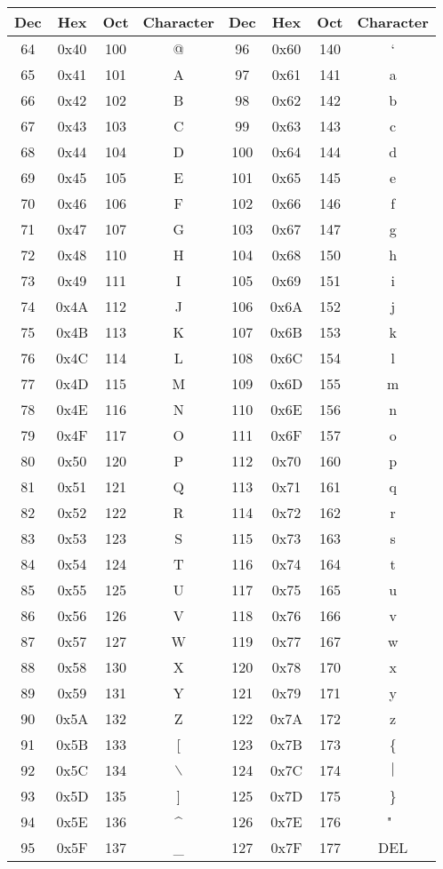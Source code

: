 \begin{longtable}{|c|c|c|c||c|c|c|c|}
\hline
Dec & Hex & Oct & Character & Dec & Hex & Oct & Character\\
\hline
64 & 0x40 & 100 & @ & 96 & 0x60 & 140 & ` \\
65 & 0x41 & 101 & A & 97 & 0x61 & 141 & a \\
66 & 0x42 & 102 & B & 98 & 0x62 & 142 & b \\
67 & 0x43 & 103 & C & 99 & 0x63 & 143 & c \\
68 & 0x44 & 104 & D & 100 & 0x64 & 144 & d \\
69 & 0x45 & 105 & E & 101 & 0x65 & 145 & e \\
70 & 0x46 & 106 & F & 102 & 0x66 & 146 & f \\
71 & 0x47 & 107 & G & 103 & 0x67 & 147 & g \\
72 & 0x48 & 110 & H & 104 & 0x68 & 150 & h \\
73 & 0x49 & 111 & I & 105 & 0x69 & 151 & i \\
74 & 0x4A & 112 & J & 106 & 0x6A & 152 & j \\
75 & 0x4B & 113 & K & 107 & 0x6B & 153 & k \\
76 & 0x4C & 114 & L & 108 & 0x6C & 154 & l \\
77 & 0x4D & 115 & M & 109 & 0x6D & 155 & m \\
78 & 0x4E & 116 & N & 110 & 0x6E & 156 & n \\
79 & 0x4F & 117 & O & 111 & 0x6F & 157 & o \\
80 & 0x50 & 120 & P & 112 & 0x70 & 160 & p \\
81 & 0x51 & 121 & Q & 113 & 0x71 & 161 & q \\
82 & 0x52 & 122 & R & 114 & 0x72 & 162 & r \\
83 & 0x53 & 123 & S & 115 & 0x73 & 163 & s \\
84 & 0x54 & 124 & T & 116 & 0x74 & 164 & t \\
85 & 0x55 & 125 & U & 117 & 0x75 & 165 & u \\
86 & 0x56 & 126 & V & 118 & 0x76 & 166 & v \\
87 & 0x57 & 127 & W & 119 & 0x77 & 167 & w \\
88 & 0x58 & 130 & X & 120 & 0x78 & 170 & x \\
89 & 0x59 & 131 & Y & 121 & 0x79 & 171 & y \\
90 & 0x5A & 132 & Z & 122 & 0x7A & 172 & z \\
91 & 0x5B & 133 & [ & 123 & 0x7B & 173 & \{ \\
92 & 0x5C & 134 & $\backslash$ & 124 & 0x7C & 174 & $\mid$\\
93 & 0x5D & 135 & ] & 125 & 0x7D & 175 & \} \\
94 & 0x5E & 136 & \^{} & 126 & 0x7E & 176 & "~ \\
95 & 0x5F & 137 & \_ & 127 & 0x7F & 177 & DEL \\
\hline
\end{longtable}

